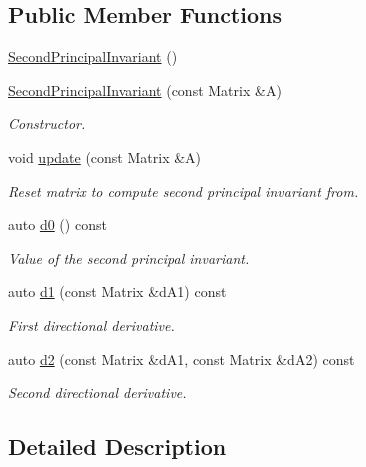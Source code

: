 \subsection*{\-Public \-Member \-Functions}
\begin{DoxyCompactItemize}
\item 
\hyperlink{classFunG_1_1LinearAlgebra_1_1SecondPrincipalInvariant_a74c9f3d1fdbfc66bb991afc20bb59d6b}{\-Second\-Principal\-Invariant} ()
\item 
\hyperlink{classFunG_1_1LinearAlgebra_1_1SecondPrincipalInvariant_ab04cf850a3475333f64e5e4d572d0685}{\-Second\-Principal\-Invariant} (const \-Matrix \&\-A)
\begin{DoxyCompactList}\small\item\em \-Constructor. \end{DoxyCompactList}\item 
void \hyperlink{classFunG_1_1LinearAlgebra_1_1SecondPrincipalInvariant_a511f6f78f64fc8f1fe9315c8256e285f}{update} (const \-Matrix \&\-A)
\begin{DoxyCompactList}\small\item\em \-Reset matrix to compute second principal invariant from. \end{DoxyCompactList}\item 
auto \hyperlink{classFunG_1_1LinearAlgebra_1_1SecondPrincipalInvariant_af7df9e46d302c070777db975c1161df0}{d0} () const 
\begin{DoxyCompactList}\small\item\em \-Value of the second principal invariant. \end{DoxyCompactList}\item 
auto \hyperlink{classFunG_1_1LinearAlgebra_1_1SecondPrincipalInvariant_aae55f9cb645def405d16fdbdcc6ccc6b}{d1} (const \-Matrix \&d\-A1) const 
\begin{DoxyCompactList}\small\item\em \-First directional derivative. \end{DoxyCompactList}\item 
auto \hyperlink{classFunG_1_1LinearAlgebra_1_1SecondPrincipalInvariant_aa1e9d775263e231afd1a8ba9cdc17963}{d2} (const \-Matrix \&d\-A1, const \-Matrix \&d\-A2) const 
\begin{DoxyCompactList}\small\item\em \-Second directional derivative. \end{DoxyCompactList}\end{DoxyCompactItemize}


\subsection{\-Detailed \-Description}
